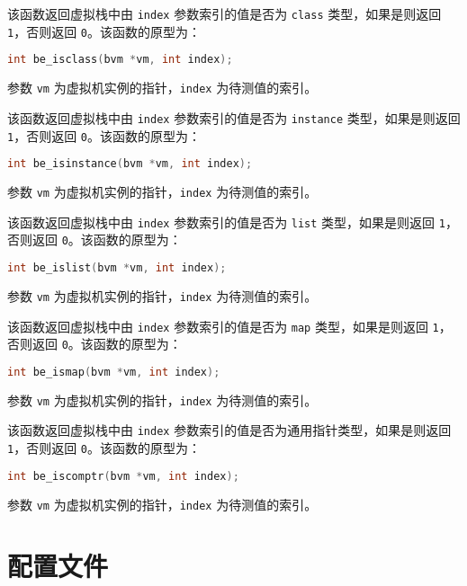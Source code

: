 该函数返回虚拟栈中由 \texttt{index} 参数索引的值是否为 \texttt{class} 类型，如果是则返回 \texttt{1}，否则返回 \texttt{0}。该函数的原型为：
\begin{lstlisting}[language=c, style=berry, numbers=none]
int be_isclass(bvm *vm, int index);
\end{lstlisting}
参数 \texttt{vm} 为虚拟机实例的指针，\texttt{index} 为待测值的索引。


该函数返回虚拟栈中由 \texttt{index} 参数索引的值是否为 \texttt{instance} 类型，如果是则返回 \texttt{1}，否则返回 \texttt{0}。该函数的原型为：
\begin{lstlisting}[language=c, style=berry, numbers=none]
int be_isinstance(bvm *vm, int index);
\end{lstlisting}
参数 \texttt{vm} 为虚拟机实例的指针，\texttt{index} 为待测值的索引。


该函数返回虚拟栈中由 \texttt{index} 参数索引的值是否为 \texttt{list} 类型，如果是则返回 \texttt{1}，否则返回 \texttt{0}。该函数的原型为：
\begin{lstlisting}[language=c, style=berry, numbers=none]
int be_islist(bvm *vm, int index);
\end{lstlisting}
参数 \texttt{vm} 为虚拟机实例的指针，\texttt{index} 为待测值的索引。


该函数返回虚拟栈中由 \texttt{index} 参数索引的值是否为 \texttt{map} 类型，如果是则返回 \texttt{1}，否则返回 \texttt{0}。该函数的原型为：
\begin{lstlisting}[language=c, style=berry, numbers=none]
int be_ismap(bvm *vm, int index);
\end{lstlisting}
参数 \texttt{vm} 为虚拟机实例的指针，\texttt{index} 为待测值的索引。


该函数返回虚拟栈中由 \texttt{index} 参数索引的值是否为通用指针类型，如果是则返回 \texttt{1}，否则返回 \texttt{0}。该函数的原型为：
\begin{lstlisting}[language=c, style=berry, numbers=none]
int be_iscomptr(bvm *vm, int index);
\end{lstlisting}
参数 \texttt{vm} 为虚拟机实例的指针，\texttt{index} 为待测值的索引。

\section{配置文件}

